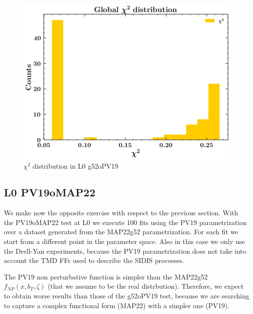 \documentclass[12pt]{report}
\begin{document}
\begin{figure}[!h]
    \centering
    \includegraphics[scale=0.5]{Images/L0_tests/Globalchi2_g52oPV19.png}
    \caption{$\chi^2$ distribution in L0 g52oPV19}
    \label{fig:chi2_dist_1}
\end{figure}

\subsection{L0 PV19oMAP22}

We make now the opposite exercise with respect to the previous section. With the PV19oMAP22 test at L0 we execute 100 fits using the PV19 parametrization over a dataset generated from the MAP22g52 parametrization. For each fit we start from a different point in the parameter space. Also in this case we only use the Drell-Yan experiments, because the PV19 parametrization does not take into account the TMD FFs used to describe the SIDIS processes.

The PV19 non perturbative function is simpler than the MAP22g52 $f_{NP}(x, b_T, \zeta)$ (that we assume to be the real distrbution). Therefore, we expect to obtain worse results than those of the g52oPV19 test, because we are searching to capture a complex functional form (MAP22) with a simpler one (PV19).\\
\end{document}
